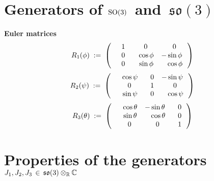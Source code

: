 
\section{Generators of \;$\textnormal{SO}(3)$\, and \,$\mathfrak{so}(3)$}


\vskip 0.1cm
\noindent
\textbf{Euler matrices}
\begin{equation*}
R_{1}(\phi)
\; := \;
	\left(\,
		\begin{array}{ccc}
			{\color{white}-}1 & {\color{white}-}0 & {\color{white}-}0 \\
			{\color{white}-}0 & {\color{white}-}\cos\phi & -\sin\phi \\
			{\color{white}-}0 & {\color{white}-}\sin\phi & {\color{white}-}\cos\phi \\
			\end{array}
		\,\right)
\end{equation*}
\begin{equation*}
R_{2}(\psi)
\; := \;
	\left(\,
		\begin{array}{ccc}
			{\color{white}-}\cos\psi & {\color{white}-}0 & {\color{black}-}\sin\psi \\
			{\color{white}-}0 & {\color{white}-}1 & {\color{white}-}0 \\
			{\color{white}-}\sin\psi & {\color{white}-}0 & {\color{white}-}\cos\psi \\
			\end{array}
		\,\right)
\end{equation*}
\begin{equation*}
R_{3}(\theta)
\; := \;
	\left(\,
		\begin{array}{ccc}
			{\color{white}-}\cos\theta & -\sin\theta & {\color{white}-}0 \\
			{\color{white}-}\sin\theta & {\color{white}-}\cos\theta & {\color{white}-}0 \\
			{\color{white}-}0 & {\color{white}-}0 & {\color{white}-}1 \\
			\end{array}
		\,\right)
\end{equation*}


\section{Properties of the generators \,$J_{1}, J_{2}, J_{3} \,\in\, \mathfrak{so}(3) \otimes_{\mathbb{R}} \mathbb{C}$}

